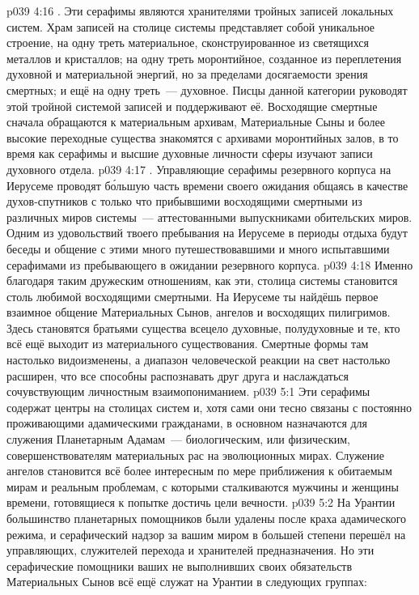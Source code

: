 \vs p039 4:16 . Эти серафимы являются хранителями тройных записей локальных систем. Храм записей на столице системы представляет собой уникальное строение, на одну треть материальное, сконструированное из светящихся металлов и кристаллов; на одну треть моронтийное, созданное из переплетения духовной и материальной энергий, но за пределами досягаемости зрения смертных; и ещё на одну треть~--- духовное. Писцы данной категории руководят этой тройной системой записей и поддерживают её. Восходящие смертные сначала обращаются к материальным архивам, Материальные Сыны и более высокие переходные существа знакомятся с архивами моронтийных залов, в то время как серафимы и высшие духовные личности сферы изучают записи духовного отдела.
\vs p039 4:17 . Управляющие серафимы резервного корпуса на Иерусеме проводят б\'ольшую часть времени своего ожидания общаясь в качестве духов\hyp{}спутников с только что прибывшими восходящими смертными из различных миров системы~--- аттестованными выпускниками обительских миров. Одним из удовольствий твоего пребывания на Иерусеме в периоды отдыха будут беседы и общение с этими много путешествовавшими и много испытавшими серафимами из пребывающего в ожидании резервного корпуса.
\vs p039 4:18 Именно благодаря таким дружеским отношениям, как эти, столица системы становится столь любимой восходящими смертными. На Иерусеме ты найдёшь первое взаимное общение Материальных Сынов, ангелов и восходящих пилигримов. Здесь становятся братьями существа всецело духовные, полудуховные и те, кто всё ещё выходит из материального существования. Смертные формы там настолько видоизменены, а диапазон человеческой реакции на свет настолько расширен, что все способны распознавать друг друга и наслаждаться сочувствующим личностным взаимопониманием.
\vs p039 5:1 Эти серафимы содержат центры на столицах систем и, хотя сами они тесно связаны с постоянно проживающими адамическими гражданами, в основном назначаются для служения Планетарным Адамам~--- биологическим, или физическим, совершенствователям материальных рас на эволюционных мирах. Служение ангелов становится всё более интересным по мере приближения к обитаемым мирам и реальным проблемам, с которыми сталкиваются мужчины и женщины времени, готовящиеся к попытке достичь цели вечности.
\vs p039 5:2 На Урантии большинство планетарных помощников были удалены после краха адамического режима, и серафический надзор за вашим миром в большей степени перешёл на управляющих, служителей перехода и хранителей предназначения. Но эти серафические помощники ваших не выполнивших своих обязательств Материальных Сынов всё ещё служат на Урантии в следующих группах:
